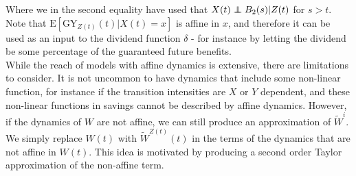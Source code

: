 \documentclass[12pt]{article}
\newcommand{\E}{\text{E}}
\newcommand{\indic}[1]{\mathds{1}_{ \{ #1 \} }}
\newcommand\independent{\protect\mathpalette{\protect\independenT}{\perp}}
\def\independenT#1#2{\mathrel{\rlap{$#1#2$}\mkern2mu{#1#2}}}
\theoremstyle{my_thm}
\begin{document}
Where we in the second equality have used that $X(t)\independent B_2(s)|Z(t)$ for $s>t$. Note that $\E[\text{GY}_{Z(t)}(t)|X(t)=x]$ is affine in $x$, and therefore it can be used as an input to the dividend function $\delta$ - for instance by letting the dividend be some percentage of the guaranteed future benefits.
\\[12pt]
While the reach of models with affine dynamics is extensive, there are limitations to consider. It is not uncommon to have dynamics that include some non-linear function, for instance if the transition intensities are $X$ or $Y$ dependent, and these non-linear functions in savings cannot be described by affine dynamics. However, if the dynamics of $W$ are not affine, we can still produce an approximation of $\tilde{W}^i$. We simply replace $W(t)$ with $\tilde{W}^{Z(t)}(t)$ in the terms of the dynamics that are not affine in $W(t)$. This idea is motivated by producing a second order Taylor approximation of the non-affine term.



\iffalse
We are interested in $\tilde{W}^i(t)$ for $i \in \mathcal{J}$, noting that the relation between $\tilde{W}^i$ and $\E_0[W(t)]$ is given by
\begin{align*}
\E_0[W(t)] =&
\sum_{i:i\in \mathcal{J}} \tilde{W}^i(t).
\end{align*}


We can even calculate the present value of all future benefits including bonus
\begin{align*}
\text{G}_i(t)=&\E \left[ \int_t^n e^{-\int_t^s r} d \left( B_1(s)+\frac{X(s)-V_1^{Z(s)*}(s)}{V_2^{Z(s)*}(s)}B_2(s) \right) \big|Z(t)=i \right]
\\
=&
\int_t^n e^{-\int_t^s r} \sum_{j:j \in \mathcal{J}} p_{ij}(t,s) \left( b_1^j(s)+ \sum_{k:k\neq j} \mu^{jk}(s) b^{jk}(s)  \right) ds
\\
&+
\int_t^n e^{-\int_t^s r} \sum_{j:j \in \mathcal{J}} p_{ij}(t,s) \frac{\E[X(s)|Z(s)=j,Z(t)=i]-V_1^{j*}(s)}{V_2^{j*}(s)}\left( b_1^j(s)+ \sum_{k:k\neq j} \mu^{jk}(s) b^{jk}(s)  \right) ds
\end{align*}
by using that $\E[X(s)|Z(s)=j,Z(t)=i]=\frac{\tilde{X}^j(s)}{p_{ij}(t,s)p{0i}(0,t)}$.
\fi
\end{document}
